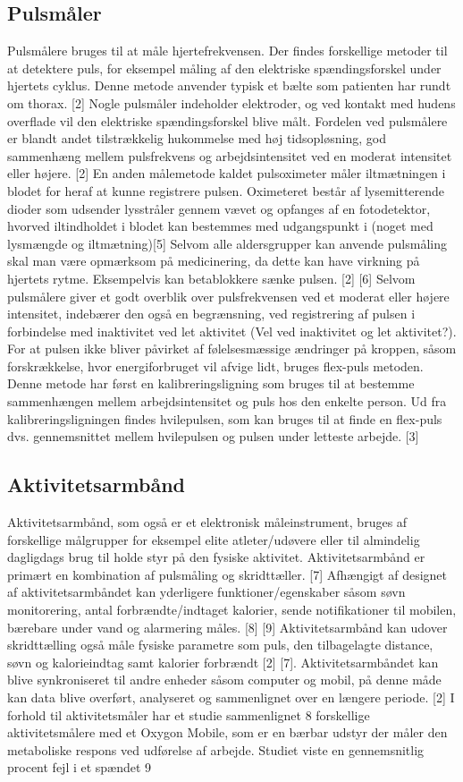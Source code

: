 \subsection{Pulsmåler}
Pulsmålere bruges til at måle hjertefrekvensen. Der findes forskellige metoder til at detektere
puls, for eksempel måling af den elektriske spændingsforskel under hjertets cyklus. Denne
metode anvender typisk et bælte som patienten har rundt om thorax. [2] Nogle pulsmåler indeholder elektroder, og ved kontakt med hudens overflade vil den elektriske spændingsforskel blive målt. Fordelen ved pulsmålere er blandt andet tilstrækkelig hukommelse med høj tidsopløsning, god sammenhæng mellem pulsfrekvens og arbejdsintensitet ved en moderat intensitet eller højere. [2] En anden målemetode kaldet pulsoximeter måler iltmætningen i blodet for heraf at kunne registrere pulsen. Oximeteret består af lysemitterende dioder som udsender lysstråler gennem vævet og opfanges af en fotodetektor, hvorved iltindholdet i blodet kan bestemmes med udgangspunkt i (noget med lysmængde og iltmætning)[5] Selvom alle aldersgrupper kan anvende pulsmåling skal man være opmærksom på medicinering, da dette kan have virkning på hjertets rytme. Eksempelvis kan betablokkere sænke pulsen. [2] [6]
Selvom pulsmålere giver et godt overblik over pulsfrekvensen ved et moderat eller højere intensitet, indebærer den også en begrænsning, ved registrering af pulsen i forbindelse med inaktivitet ved let aktivitet (Vel ved inaktivitet og let aktivitet?). For at pulsen ikke bliver påvirket af følelsesmæssige ændringer på kroppen, såsom forskrækkelse, hvor energiforbruget vil afvige lidt, bruges flex-puls metoden. Denne metode har først en kalibreringsligning som bruges til at bestemme sammenhængen mellem arbejdsintensitet og puls hos den enkelte person. Ud fra kalibreringsligningen findes hvilepulsen, som kan bruges til at finde en flex-puls dvs. gennemsnittet mellem hvilepulsen og pulsen under letteste arbejde. [3]

\subsection{Aktivitetsarmbånd}
Aktivitetsarmbånd, som også er et elektronisk måleinstrument, bruges af forskellige
målgrupper for eksempel elite atleter/udøvere eller til almindelig dagligdags brug til holde styr på den fysiske aktivitet. Aktivitetsarmbånd er primært en kombination af pulsmåling og skridttæller. [7] Afhængigt af designet af aktivitetsarmbåndet kan yderligere funktioner/egenskaber såsom søvn monitorering, antal forbrændte/indtaget kalorier, sende notifikationer til mobilen, bærebare under vand og alarmering måles. [8] [9]  
Aktivitetsarmbånd kan udover skridttælling også måle fysiske parametre som puls, den tilbagelagte distance, søvn og kalorieindtag samt kalorier forbrændt [2] [7]. Aktivitetsarmbåndet kan blive synkroniseret til andre enheder såsom computer og mobil, på denne måde kan data blive overført, analyseret og sammenlignet over en længere periode. [2]
I forhold til aktivitetsmåler har et studie sammenlignet 8 forskellige aktivitetsmålere med et Oxygon Mobile, som er en bærbar udstyr der måler den metaboliske respons ved udførelse af arbejde. Studiet viste en gennemsnitlig procent fejl i et spændet 9%

